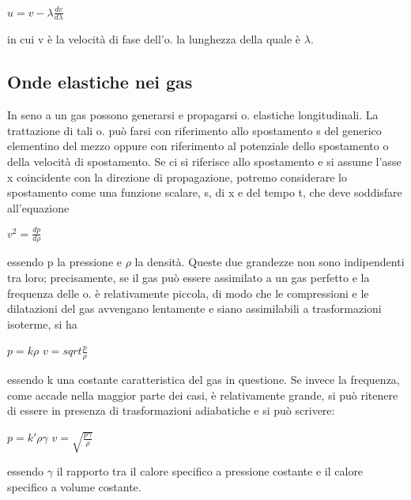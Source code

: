 \documentclass[a4paper]{article}
\begin{document}
$u=v-\lambda \frac{dv}{d\lambda}$

in cui v è la velocità di fase dell’o. la lunghezza della quale è $\lambda$. 

\subsection{Onde elastiche nei gas}
In seno a un gas possono generarsi e propagarsi o. elastiche longitudinali. La trattazione di tali o. può farsi con riferimento allo spostamento s del generico elementino del mezzo oppure con riferimento al potenziale dello spostamento o della velocità di spostamento. Se ci si riferisce allo spostamento e si assume l’asse x coincidente con la direzione di propagazione, potremo considerare lo spostamento come una funzione scalare, s, di x e del tempo t, che deve soddisfare all’equazione 

$v^2=\frac{dp}{d\rho}$

essendo p la pressione e $\rho$ la densità. Queste due grandezze non sono indipendenti tra loro; precisamente, se il gas può essere assimilato a un gas perfetto e la frequenza delle o. è relativamente piccola, di modo che le compressioni e le dilatazioni del gas avvengano lentamente e siano assimilabili a trasformazioni isoterme, si ha 

$p=k\rho$
$v=sqrt{\frac{p}{\rho}}$

essendo k una costante caratteristica del gas in questione. Se invece la frequenza, come accade nella maggior parte dei casi, è relativamente grande, si può ritenere di essere in presenza di trasformazioni adiabatiche e si può scrivere: 

$p=k'\rho \gamma$
$v=\sqrt{\frac{p\gamma}{\rho}}$

essendo $\gamma$ il rapporto tra il calore specifico a pressione costante e il calore specifico a volume costante.
\end{document}

